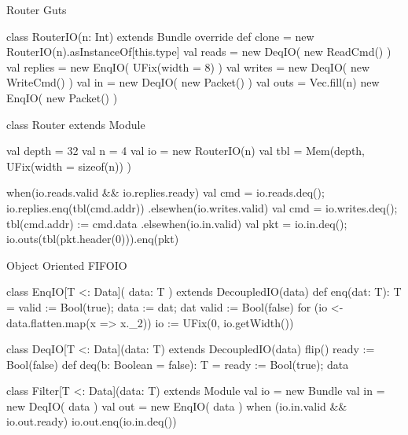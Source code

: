 \documentclass[xcolor=pdflatex,dvipsnames,table]{beamer}
\begin{document}
\begin{frame}[fragile]{Router Guts}

{
\begin{scala}
class RouterIO(n: Int) extends Bundle {
  override def clone = new RouterIO(n).asInstanceOf[this.type]
  val reads   = new DeqIO( new ReadCmd() )
  val replies = new EnqIO( UFix(width = 8) )
  val writes  = new DeqIO( new WriteCmd() )
  val in      = new DeqIO( new Packet() )
  val outs    = Vec.fill(n){ new EnqIO( new Packet() ) }
}

class Router extends Module {
  val depth = 32
  val n     = 4
  val io    = new RouterIO(n)
  val tbl   = Mem(depth, UFix(width = sizeof(n)) )
  
  when(io.reads.valid && io.replies.ready) { 
    val cmd = io.reads.deq();  io.replies.enq(tbl(cmd.addr))  
  } .elsewhen(io.writes.valid) { 
    val cmd = io.writes.deq(); tbl(cmd.addr) := cmd.data
  } .elsewhen(io.in.valid) {
    val pkt = io.in.deq(); io.outs(tbl(pkt.header(0))).enq(pkt) 
  } 
}
\end{scala}
}
\end{frame}

\begin{frame}[fragile]{Object Oriented FIFOIO}

{
\begin{scala}
class EnqIO[T <: Data]( data: T ) extends DecoupledIO(data) {
  def enq(dat: T): T = { valid := Bool(true); data := dat; dat }
  valid := Bool(false)
  for (io <- data.flatten.map(x => x._2))
    io := UFix(0, io.getWidth())
}

class DeqIO[T <: Data](data: T) extends DecoupledIO(data) {
  flip()
  ready := Bool(false)
  def deq(b: Boolean = false): T = { ready := Bool(true); data }
}

class Filter[T <: Data](data: T) extends Module {
  val io = new Bundle {
    val in  = new DeqIO( data )
    val out = new EnqIO( data )
  }
  when (io.in.valid && io.out.ready) {
    io.out.enq(io.in.deq())
  }
}
\end{scala}
}
\end{frame}
\end{document}
